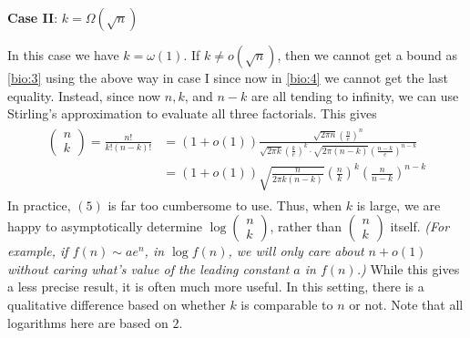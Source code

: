 \documentclass{article}
\begin{document}
\textbf{Case II}: $k=\Omega (\sqrt{n})$

In this case we have $k=\omega (1)$. If $k \neq o(\sqrt{n})$, then we cannot get a bound as \cref{bio:3} using the above way in case I since now in \cref{bio:4} we cannot get the last equality. Instead, since now $n, k$, and $n-k$ are all tending to infinity, we can use Stirling's approximation to evaluate all three factorials. This gives
\begin{align}
\begin{aligned}
\left(\begin{array}{l}
n \\
k
\end{array}\right)=\frac{n !}{k !(n-k) !} &=(1+o(1)) \frac{\sqrt{2 \pi n}\left(\frac{n}{e}\right)^{n}}{\sqrt{2 \pi k}\left(\frac{k}{e}\right)^{k} \cdot \sqrt{2 \pi(n-k)}\left(\frac{n-k}{e}\right)^{n-k}} \\
&=(1+o(1)) \sqrt{\frac{n}{2 \pi k(n-k)}}\left(\frac{n}{k}\right)^{k}\left(\frac{n}{n-k}\right)^{n-k}  \label{bio:6}
\end{aligned}
\end{align}
In practice, $(5)$ is far too cumbersome to use. Thus, when $k$ is large, we are happy to asymptotically determine $\log \left(\begin{array}{l}n \\ k\end{array}\right)$, rather than $\left(\begin{array}{c}n \\ k\end{array}\right)$ itself.  \emph{(For example, if $f(n)\sim ae^n$, in $\log f(n)$, we will only care about $n+o(1)$ without caring what's value of the leading constant $a$ in $f(n)$.)} While this gives a less precise result, it is often much more useful. In this setting, there is a qualitative difference based on whether $k$ is comparable to $n$ or not. Note that all logarithms here are based on $2$.
\end{document}
